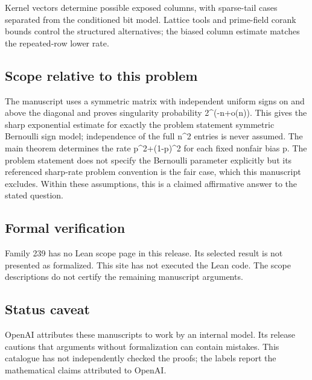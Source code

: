 \documentclass[11pt]{article}
\begin{document}
Kernel vectors determine possible exposed columns, with sparse-tail cases separated from the conditioned bit model. Lattice tools and prime-field corank bounds control the structured alternatives; the biased column estimate matches the repeated-row lower rate.

\subsection{Scope relative to this problem}
The manuscript uses a symmetric matrix with independent uniform signs on and above the diagonal and proves singularity probability 2\textasciicircum{}(-n+o(n)). This gives the sharp exponential estimate for exactly the problem statement symmetric Bernoulli sign model; independence of the full n\textasciicircum{}2 entries is never assumed. The main theorem determines the rate p\textasciicircum{}2+(1-p)\textasciicircum{}2 for each fixed nonfair bias p. The problem statement does not specify the Bernoulli parameter explicitly but its referenced sharp-rate problem convention is the fair case, which this manuscript excludes. Within these assumptions, this is a claimed affirmative answer to the stated question.

\subsection{Formal verification}
Family 239 has no Lean scope page in this release. Its selected result is not presented as formalized. This site has not executed the Lean code. The scope descriptions do not certify the remaining manuscript arguments.

\subsection{Status caveat}
OpenAI attributes these manuscripts to work by an internal model. Its release cautions that arguments without formalization can contain mistakes. This catalogue has not independently checked the proofs; the labels report the mathematical claims attributed to OpenAI.
\end{document}
